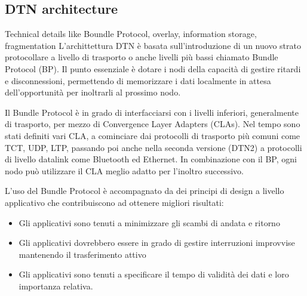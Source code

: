 \documentclass[a4paper]{article}
\begin{document}
		
		\subsection{DTN architecture}
		{\sc Technical details like Boundle Protocol, overlay, information storage, fragmentation}
		L'archittettura DTN è basata sull'introduzione di un nuovo strato protocollare a livello di trasporto o anche livelli più bassi chiamato Bundle Protocol (BP). Il punto essenziale è dotare i nodi della capacità di gestire ritardi e disconnessioni, permettendo di memorizzare i dati localmente in attesa dell'opportunità per inoltrarli al prossimo nodo. 
		
		Il Bundle Protocol è in grado di interfacciarsi con i livelli inferiori, generalmente di trasporto, per mezzo di Convergence Layer Adapters (CLAs). Nel tempo sono stati definiti vari CLA, a cominciare dai protocolli di trasporto più comuni come TCT, UDP, LTP, passando poi anche nella seconda versione (DTN2) a protocolli di livello datalink come Bluetooth ed Ethernet. 
		In combinazione con il BP, ogni nodo può utilizzare il CLA meglio adatto per l'inoltro successivo. 
		
		L'uso del Bundle Protocol è accompagnato da dei principi di design a livello applicativo che contribuiscono ad ottenere migliori risultati:
		\begin{itemize}
			\item Gli applicativi sono tenuti a minimizzare gli scambi di andata e ritorno
			\item Gli applicativi dovrebbero essere in grado di gestire interruzioni improvvise mantenendo il trasferimento attivo
			\item Gli applicativi sono tenuti a specificare il tempo di validità dei dati e loro importanza relativa.
		\end{itemize}
		
\end{document}
